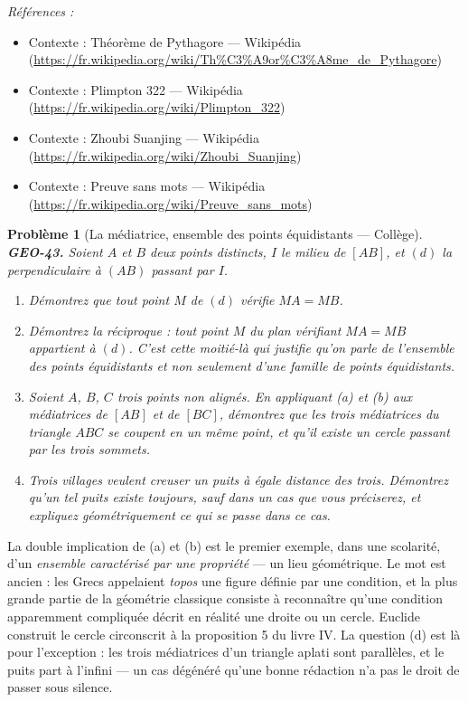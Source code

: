 \documentclass[11pt]{article}
\newtheorem{problem}{Problème}
\newenvironment{refs}{\par\small\noindent\emph{Références :}\begin{itemize}\setlength\itemsep{0pt}}{\end{itemize}\normalsize}
\begin{document}
\begin{refs}
\item Contexte : Théorème de Pythagore --- Wikipédia (\url{https://fr.wikipedia.org/wiki/Th%C3%A9or%C3%A8me_de_Pythagore})
\item Contexte : Plimpton 322 --- Wikipédia (\url{https://fr.wikipedia.org/wiki/Plimpton_322})
\item Contexte : Zhoubi Suanjing --- Wikipédia (\url{https://fr.wikipedia.org/wiki/Zhoubi_Suanjing})
\item Contexte : Preuve sans mots --- Wikipédia (\url{https://fr.wikipedia.org/wiki/Preuve_sans_mots})
\end{refs}

\bigskip

\begin{problem}[{La médiatrice, ensemble des points équidistants --- Collège}]
\textbf{GEO-43.} Soient $ A $ et $ B $ deux points distincts, $ I $ le milieu de
$ [AB] $, et $ (d) $ la perpendiculaire à $ (AB) $ passant par $ I $.
\begin{enumerate}
\item[(a)] Démontrez que tout point $ M $ de $ (d) $ vérifie $ MA = MB $.
\item[(b)] Démontrez la réciproque : tout point $ M $ du plan vérifiant $ MA = MB $ appartient à
$ (d) $. C'est cette moitié-là qui justifie qu'on parle de \textit{l'}ensemble des points
équidistants et non seulement d'une famille de points équidistants.
\item[(c)] Soient $ A $, $ B $, $ C $ trois points non alignés. En appliquant (a) et (b) aux
médiatrices de $ [AB] $ et de $ [BC] $, démontrez que les trois médiatrices du triangle
$ ABC $ se coupent en un même point, et qu'il existe un cercle passant par les trois sommets.
\item[(d)] Trois villages veulent creuser un puits à égale distance des trois. Démontrez qu'un tel puits
existe toujours, sauf dans un cas que vous préciserez, et expliquez géométriquement ce qui se passe
dans ce cas.
\end{enumerate}

\end{problem}

\noindent La double implication de (a) et (b) est le premier exemple, dans une scolarité, d'un
\textit{ensemble caractérisé par une propriété} --- un lieu géométrique. Le mot est ancien : les Grecs
appelaient \textit{topos} une figure définie par une condition, et la plus grande partie de la géométrie
classique consiste à reconnaître qu'une condition apparemment compliquée décrit en réalité une droite
ou un cercle. Euclide construit le cercle circonscrit à la proposition 5 du livre IV. La question (d)
est là pour l'exception : les trois médiatrices d'un triangle aplati sont parallèles, et le puits
part à l'infini --- un cas dégénéré qu'une bonne rédaction n'a pas le droit de passer sous silence.
\end{document}
